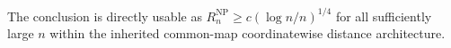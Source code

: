 The conclusion is directly usable as \(R_n^{\mathrm{NP}}\geq c(\log n/n)^{1/4}\) for all sufficiently large \(n\) within the inherited common-map coordinatewise distance architecture.